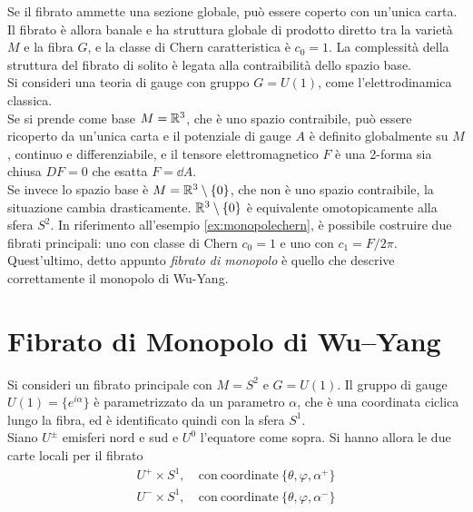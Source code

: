 Se il fibrato ammette una sezione globale, può essere coperto con un'unica carta.
Il fibrato è allora banale e ha struttura globale di prodotto diretto tra la
varietà $M$ e la fibra $G$, e la classe di Chern caratteristica è $c_0 = 1$.
La complessità della struttura del fibrato di solito è legata alla contraibilità
dello spazio base.\\

Si consideri una teoria di gauge con gruppo $G = U(1)$, come l'elettrodinamica classica.\\

Se si prende come base $M = \mathbb{R}^3$, che è uno spazio contraibile, può essere
ricoperto da un'unica carta e il potenziale di gauge $A$ è definito globalmente su $M$,
continuo e differenziabile, e il tensore elettromagnetico $F$ è una 2-forma
sia chiusa $DF = 0$ che esatta $F = \dd A$.\\

Se invece lo spazio base è $M = \mathbb{R}^3 \setminus \{0\}$, che non è uno spazio
contraibile, la situazione cambia drasticamente. $\mathbb{R}^3 \setminus \{0\}$ è
equivalente omotopicamente alla sfera $S^2$.
In riferimento all'esempio \ref{ex:monopolechern}, è possibile costruire due fibrati
principali: uno con classe di Chern $c_0 = 1$ e uno con $c_1 = F/2\pi$. Quest'ultimo,
detto appunto \emph{fibrato di monopolo} è quello che descrive correttamente il
monopolo di Wu-Yang.
\section{Fibrato di Monopolo di Wu–Yang}\label{sec:wuyangmonopole}
Si consideri un fibrato principale con $M = S^2$ e $G = U(1)$.
Il gruppo di gauge $U(1) = \{e^{i\alpha} \}$ è parametrizzato da un
parametro $\alpha$, che è una coordinata ciclica lungo la fibra, ed è identificato
quindi con la sfera $S^1$.\\



Siano $U^\pm$ emisferi nord e sud e $U^0$ l'equatore come sopra.
Si hanno allora le due carte locali per il fibrato
\begin{equation}
   \begin{aligned}
      U^+ \times S^1 ,&  \mathrm{\:con\: coordinate\:} \{ \theta, \varphi ,\alpha^+ \}\\
      U^- \times S^1 ,&  \mathrm{\:con\: coordinate\:} \{ \theta, \varphi ,\alpha^- \}
   \end{aligned}
\end{equation}


